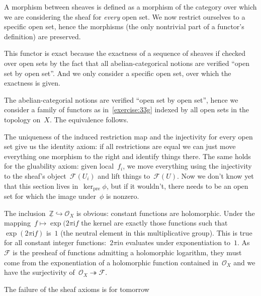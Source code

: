 \begin{exercise}
  \label{exercise:33g}
  A morphism between sheaves is defined as a morphism of the category over which we are considering the sheaf for \emph{every} open set. We now restrict ourselves to a specific open set, hence the morphisms (the only nontrivial part of a functor's definition) are preserved. 

  This functor is exact because the exactness of a sequence of sheaves if checked over open sets by the fact that all abelian-categorical notions are verified ``open set by open set''. And we only consider a specific open set, over which the exactness is given.
\end{exercise}

\begin{exercise}
  The abelian-categorial notions are verified ``open set by open set'', hence we consider a family of functors as in~\autoref{exercise:33g} indexed by all open sets in the topology on~$X$. The equivalence follows.
\end{exercise}

\begin{exercise}
  \label{exercise:33i}
  The uniqueness of the induced restriction map and the injectivity for every open set give us the identity axiom: if all restrictions are equal we can just move everything one morphism to the right and identify things there. The same holds for the gluability axiom: given local~$f_i$, we move everything using the injectivity to the sheaf's object~$\mathcal{F}(U_i)$ and lift things to~$\mathcal{F}(U)$. Now we don't know yet that this section lives in~$\ker_{\textrm{pre}}\phi$, but if it wouldn't, there needs to be an open set for which the image under~$\phi$ is nonzero.
\end{exercise}

\begin{exercise}
  \label{exercise:33j}
  The inclusion~$\underline{\mathbb{Z}}\hookrightarrow\mathcal{O}_X$ is obvious: constant functions are holomorphic. Under the mapping~$f\mapsto\exp(2\pi\mathrm{i}f$ the kernel are exactly those functions such that~$\exp(2\pi\mathrm{i}f)$ is~$1$ (the neutral element in this multiplicative group). This is true for all constant integer functions:~$2\pi\mathrm{i}n$ evaluates under exponentiation to~$1$. As~$\mathcal{F}$ is the presheaf of functions admitting a holomorphic logarithm, they must come from the exponentiation of a holomorphic function contained in~$\mathcal{O}_X$ and we have the surjectivity of~$\mathcal{O}_X\twoheadrightarrow\mathcal{F}$.

  The failure of the sheaf axioms is for tomorrow
\end{exercise}


